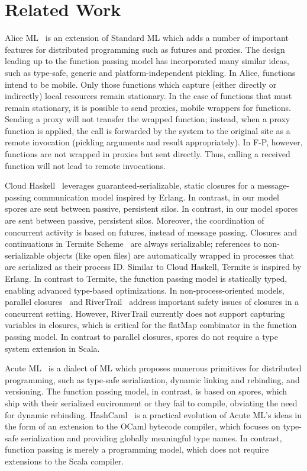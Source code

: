\documentclass{jfp1}
\begin{document}
\section{Related Work}
\label{sec:related-work}

Alice ML~\cite{AliceML} is an extension of Standard ML which adds a number of
important features for distributed programming such as futures and proxies. The
design leading up to the function passing model has incorporated many similar
ideas, such as {type-safe}, generic and platform-independent pickling. In Alice,
functions intend to be mobile. Only those functions which capture (either
directly or indirectly) local resources remain stationary. In the case of
functions that must remain stationary, it is possible to send proxies, mobile
wrappers for functions. Sending a proxy will not transfer the wrapped function;
instead, when a proxy function is applied, the call is forwarded by the system
to the original site as a remote invocation (pickling arguments and result
appropriately). In F-P, however, functions are not wrapped in proxies but sent
directly. Thus, calling a received function will not lead to remote invocations.

Cloud Haskell~\cite{CloudHaskell} leverages guaranteed-serializable, static
closures for a message-passing communication model inspired by Erlang. In
contrast, in our model spores are sent between passive, persistent silos. In
contrast, in our model spores are sent between passive, persistent silos.
Moreover, the coordination of concurrent activity is based on futures, instead
of message passing. Closures and continuations in Termite
Scheme~\cite{TermiteScheme} are always serializable; references to
non-serializable objects (like open files) are automatically wrapped in
processes that are serialized as their process ID. Similar to Cloud Haskell,
Termite is inspired by Erlang. In contrast to Termite, the function passing
model is statically typed, enabling advanced type-based optimizations. In
non-process-oriented models, parallel closures~\cite{ParallelClosures} and
RiverTrail~\cite{RiverTrail} address important safety issues of closures in a
concurrent setting. However, RiverTrail currently does not support capturing
variables in closures, which is critical for the flatMap combinator in the
function passing model. In contrast to parallel closures, spores do not require
a type system extension in Scala.

Acute ML~\cite{AcuteML} is a dialect of ML which proposes numerous primitives
for distributed programming, such as type-safe serialization, dynamic linking
and rebinding, and versioning. The function passing model, in contrast, is based
on spores, which ship with their serialized environment or they fail to compile,
obviating the need for dynamic rebinding. HashCaml~\cite{DistOCaml} is a
practical evolution of Acute ML's ideas in the form of an extension to the OCaml
bytecode compiler, which focuses on type-safe serialization and providing
globally meaningful type names. In contrast, function passing is merely a
programming model, which does not require extensions to the Scala compiler.
\end{document}

